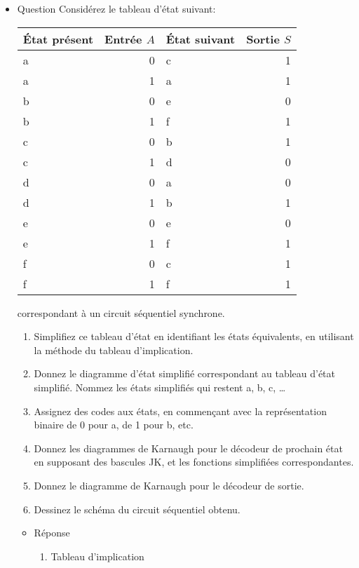 \documentclass[letter, oneside]{book}
\begin{document}
\begin{itemize}
\item Question
\label{sec:org58ed4b4}
Considérez le tableau d'état suivant:
\begin{center}
\begin{tabular}{lrlr}
État présent & Entrée \(A\) & État suivant & Sortie \(S\)\\[0pt]
\hline
a & 0 & c & 1\\[0pt]
a & 1 & a & 1\\[0pt]
b & 0 & e & 0\\[0pt]
b & 1 & f & 1\\[0pt]
c & 0 & b & 1\\[0pt]
c & 1 & d & 0\\[0pt]
d & 0 & a & 0\\[0pt]
d & 1 & b & 1\\[0pt]
e & 0 & e & 0\\[0pt]
e & 1 & f & 1\\[0pt]
f & 0 & c & 1\\[0pt]
f & 1 & f & 1\\[0pt]
\end{tabular}
\end{center}
correspondant à un circuit séquentiel synchrone.

\begin{enumerate}
\item Simplifiez ce tableau d'état en identifiant les états
équivalents, en utilisant la méthode du tableau d'implication.

\item Donnez le diagramme d'état simplifié correspondant au tableau
d'état simplifié. Nommez les états simplifiés qui restent a,
b, c, \dots{}

\item Assignez des codes aux états, en commençant avec la
représentation binaire de 0 pour a, de 1 pour b, etc.

\item Donnez les diagrammes de Karnaugh pour le décodeur de prochain
état en supposant des bascules JK, et les fonctions simplifiées
correspondantes.

\item Donnez le diagramme de Karnaugh pour le décodeur de sortie.

\item Dessinez le schéma du circuit séquentiel obtenu.
\end{enumerate}

\begin{itemize}
\item Réponse
\label{sec:orgc81bca8}
\begin{enumerate}
\item Tableau d'implication
\end{enumerate}


\end{itemize}
\end{itemize}
\end{document}
